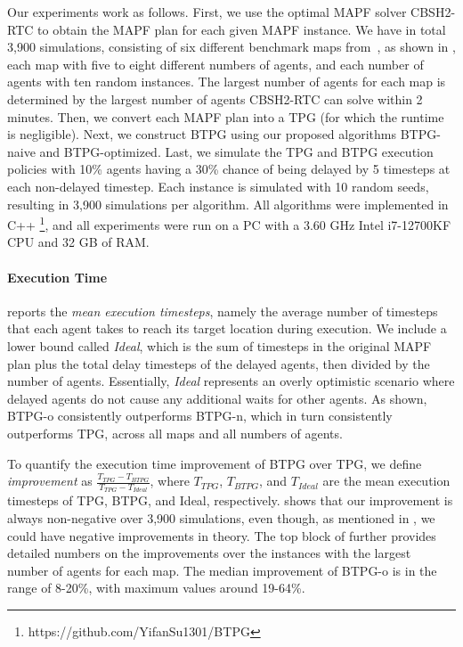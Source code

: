 \documentclass[letterpaper]{article}
\theoremstyle{definition}
\begin{document}
Our experiments work as follows. First, we use the optimal MAPF solver CBSH2-RTC \cite{li_pairwise_2021} to obtain the MAPF plan for each given MAPF instance. We have in total 3,900 simulations, consisting of six different benchmark maps from~\cite{stern_multi-agent_2021}, as shown in , each map with five to eight different numbers of agents, and each number of agents with ten random instances. The largest number of agents for each map is determined by the largest number of agents CBSH2-RTC can solve within 2 minutes.
Then, we convert each MAPF plan into a TPG (for which the runtime is negligible).
\vspace{-1.66mm}
Next, we construct BTPG using our proposed algorithms BTPG-naive and BTPG-optimized. Last, we simulate the TPG and BTPG execution policies with 10\% agents having a 30\% chance of being delayed by 5 timesteps at each non-delayed timestep. Each instance is simulated with 10 random seeds, resulting in 3,900 simulations per algorithm.
All algorithms were implemented in C++ \footnote{https://github.com/YifanSu1301/BTPG}, and all experiments were run on a PC with a 3.60 GHz Intel i7-12700KF CPU and 32 GB of RAM.


\paragraph{Execution Time}  reports the \emph{mean execution timesteps}, namely the average number of timesteps that each agent takes to reach its target location during execution. We include a lower bound called \emph{Ideal}, which is the sum of timesteps in the original MAPF plan plus the total delay timesteps of the delayed agents, then divided by the number of agents. Essentially, \emph{Ideal} represents an overly optimistic scenario where delayed agents do not cause any additional waits for other agents. As shown, BTPG-o consistently outperforms BTPG-n, which in turn consistently outperforms TPG, across all maps and all numbers of agents.

To quantify the execution time improvement of BTPG over TPG, we define \emph{improvement} as $\frac{T_{TPG} - T_{BTPG}}{T_{TPG}-T_{Ideal}}$, where $T_{TPG}$, $T_{BTPG}$, and $T_{Ideal}$ are the mean execution timesteps of TPG, BTPG, and Ideal, respectively.  shows that our improvement is always non-negative over 3,900 simulations, even though, as mentioned in , we could have negative improvements in theory. The top block of  further provides detailed numbers on the improvements over the instances with the largest number of agents for each map. The median improvement of BTPG-o is in the range of 8-20\%, with maximum values around 19-64\%.
\end{document}
